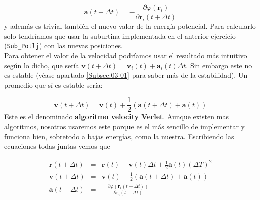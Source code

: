 \documentclass[11pt]{article} %
\newcommand{\parentesis}[1]{\left( #1  \right)}
\newcommand{\parciales}[2]{\frac{\partial #1}{\partial #2}}
\newcommand{\an}{\mathbf{a}}
\newcommand{\rn}{\mathbf{r}}
\newcommand{\vn}{\mathbf{v}}
\begin{document}
\begin{equation}
	\an (t+\Delta t) = - \parciales{\varphi (\rn_i)}{\rn_{i}(t+\Delta t)}
\end{equation}
y además es trivial también el nuevo valor de la energía potencial. Para calcularlo solo tendríamos que usar la suburtina implementada en el anterior ejercicio (\texttt{Sub\_Potlj}) con las nuevas posiciones.  \\

Para obtener el valor de la velocidad podríamos usar el resultado más intuitivo según lo dicho, que sería $\vn(t+\Delta t) = \vn_i (t) + \an_i (t) \Delta t$. Sin embargo este no es estable (véase apartado \ref{Subsec:03-01} para saber más de la estabilidad). Un promedio que sí es estable sería:

\begin{equation}
	\vn(t+\Delta t)  =  \vn(t) + \frac{1}{2} \parentesis{\an(t+\Delta t)+ \an(t)} 
\end{equation}
Este es el denominado \textbf{algoritmo velocity Verlet}. Aunque existen mas algoritmos, nosotros usaremos este porque es el más sencillo de implementar y funciona bien, sobretodo a bajas energías, como la nuestra. Escribiendo las ecuaciones todas juntas vemos que

\begin{eqnarray*}
	\rn(t+\Delta t) & = & \rn(t) + \vn(t) \Delta t + \frac{1}{2} \an (t) (\Delta T)^2 \\
	\vn(t+\Delta t) & = & \vn(t) + \frac{1}{2} \parentesis{\an(t+\Delta t)+ \an(t)} \\
	\an(t+\Delta t) & = &  - \parciales{\varphi(\rn_i (t+\Delta t))}{\rn_i (t+\Delta t)}
\end{eqnarray*}


%
%
\end{document}
